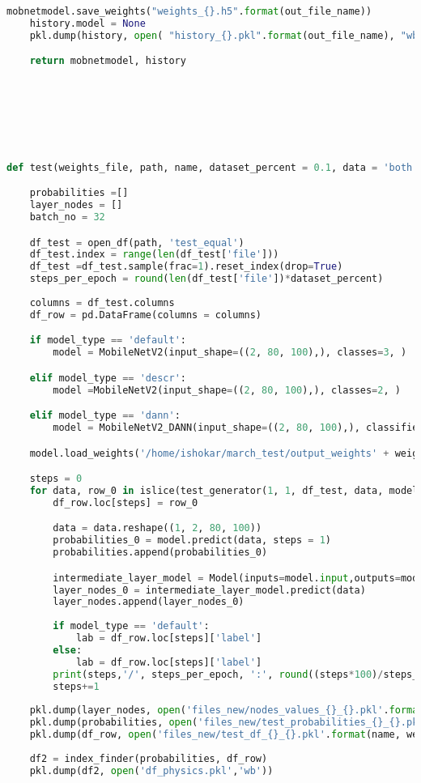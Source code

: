 \begin{lstlisting}[language=Python]
    mobnetmodel.save_weights("weights_{}.h5".format(out_file_name))
    history.model = None
    pkl.dump(history, open( "history_{}.pkl".format(out_file_name), "wb" ))

    return mobnetmodel, history







def test(weights_file, path, name, dataset_percent = 0.1, data = 'both', model_type = 'default', output = 'default'):

    probabilities =[]
    layer_nodes = []    
    batch_no = 32

    df_test = open_df(path, 'test_equal')
    df_test.index = range(len(df_test['file']))
    df_test =df_test.sample(frac=1).reset_index(drop=True)
    steps_per_epoch = round(len(df_test['file'])*dataset_percent)
    
    columns = df_test.columns    
    df_row = pd.DataFrame(columns = columns)

    if model_type == 'default':
        model = MobileNetV2(input_shape=((2, 80, 100),), classes=3, )

    elif model_type == 'descr':
        model =MobileNetV2(input_shape=((2, 80, 100),), classes=2, )

    elif model_type == 'dann':
        model = MobileNetV2_DANN(input_shape=((2, 80, 100),), classifier_classes=3, descriminator_classes = 2)

    model.load_weights('/home/ishokar/march_test/output_weights' + weights_file)

    steps = 0
    for data, row_0 in islice(test_generator(1, 1, df_test, data, model_type), steps_per_epoch):
        df_row.loc[steps] = row_0

        data = data.reshape((1, 2, 80, 100))
        probabilities_0 = model.predict(data, steps = 1)
        probabilities.append(probabilities_0)

        intermediate_layer_model = Model(inputs=model.input,outputs=model.layers[-3].output)
        layer_nodes_0 = intermediate_layer_model.predict(data)
        layer_nodes.append(layer_nodes_0)
        
        if model_type == 'default':
            lab = df_row.loc[steps]['label']
        else:
            lab = df_row.loc[steps]['label']
        print(steps,'/', steps_per_epoch, ':', round((steps*100)/steps_per_epoch, 2), '%,', probabilities_0[0], lab) 
        steps+=1
    
    pkl.dump(layer_nodes, open('files_new/nodes_values_{}_{}.pkl'.format(name, weights_file[8:-3]),'wb'))
    pkl.dump(probabilities, open('files_new/test_probabilities_{}_{}.pkl'.format(name, weights_file[8:-3]),'wb'))
    pkl.dump(df_row, open('files_new/test_df_{}_{}.pkl'.format(name, weights_file[8:-3]),'wb'))
	
    df2 = index_finder(probabilities, df_row)
    pkl.dump(df2, open('df_physics.pkl','wb'))

\end{lstlisting}

